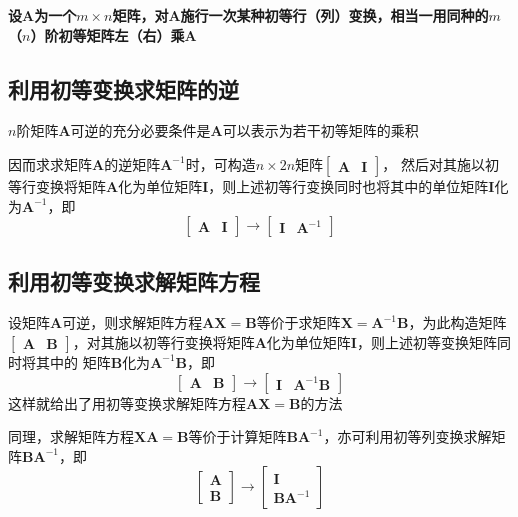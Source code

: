 \documentclass[UTF8]{ctexart}
\newcommand{\ve}[1]{{\bm{#1}}}
\newcommand{\mat}[1]{\ve{#1}}
\newcommand{\emplin}{\vspace{1em}}
\begin{document}
\textbf{设$\mat{A}$为一个$m\times n$矩阵，对$\mat{A}$施行一次某种初等行（列）变换，相当一用同种的$m$（$n$）阶初等矩阵左（右）乘$\mat{A}$}

\subsection*{利用初等变换求矩阵的逆}

$n$阶矩阵$\mat{A}$可逆的充分必要条件是$\mat{A}$可以表示为若干初等矩阵的乘积

因而求求矩阵$\mat{A}$的逆矩阵$\mat{A}^{-1}$时，可构造$n\times2n$矩阵$\displaystyle\begin{bmatrix}\mat{A}&\mat{I}\end{bmatrix}$，
然后对其施以初等行变换将矩阵$\mat{A}$化为单位矩阵$\mat{I}$，则上述初等行变换同时也将其中的单位矩阵$\mat{I}$化为$\mat{A}^{-1}$，即
\[\begin{bmatrix}\mat{A}&\mat{I}\end{bmatrix}\to\begin{bmatrix}\mat{I}&\mat{A}^{-1}\end{bmatrix}\]

\subsection*{利用初等变换求解矩阵方程}
设矩阵$\mat{A}$可逆，则求解矩阵方程$\mat{A}\mat{X}=\mat{B}$等价于求矩阵$\mat{X}=\mat{A}^{-1}\mat{B}$，为此构造矩阵
$\begin{bmatrix}\mat{A}&\mat{B}\end{bmatrix}$，对其施以初等行变换将矩阵$\mat{A}$化为单位矩阵$\mat{I}$，则上述初等变换矩阵同时将其中的
矩阵$\mat{B}$化为$\mat{A}^{-1}\mat{B}$，即
\[\begin{bmatrix}\mat{A}&\mat{B}\end{bmatrix}\to\begin{bmatrix}\mat{I}&\mat{A}^{-1}\mat{B}\end{bmatrix}\]
这样就给出了用初等变换求解矩阵方程$\mat{A}\mat{X}=\mat{B}$的方法

\emplin

同理，求解矩阵方程$\mat{X}\mat{A}=\mat{B}$等价于计算矩阵$\mat{B}\mat{A}^{-1}$，亦可利用初等列变换求解矩阵$\mat{B}\mat{A}^{-1}$，即
\[\begin{bmatrix}\mat{A}\\\mat{B}\end{bmatrix}\to\begin{bmatrix}\mat{I}\\\mat{B}\mat{A}^{-1}\end{bmatrix}\]
\end{document}
